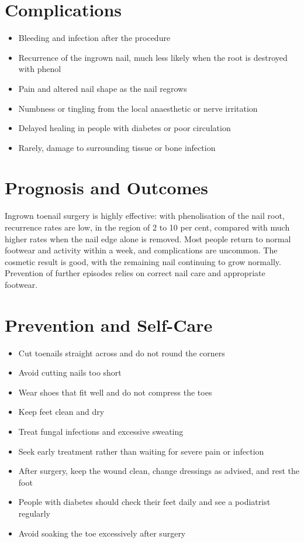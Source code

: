 \section*{Complications}
\begin{itemize}
    \item Bleeding and infection after the procedure
    \item Recurrence of the ingrown nail, much less likely when the root is destroyed with phenol
    \item Pain and altered nail shape as the nail regrows
    \item Numbness or tingling from the local anaesthetic or nerve irritation
    \item Delayed healing in people with diabetes or poor circulation
    \item Rarely, damage to surrounding tissue or bone infection
\end{itemize}

\section*{Prognosis and Outcomes}
Ingrown toenail surgery is highly effective: with phenolisation of the nail root, recurrence rates are low, in the region of 2 to 10 per cent, compared with much higher rates when the nail edge alone is removed. Most people return to normal footwear and activity within a week, and complications are uncommon. The cosmetic result is good, with the remaining nail continuing to grow normally. Prevention of further episodes relies on correct nail care and appropriate footwear.

\section*{Prevention and Self-Care}
\begin{itemize}
    \item Cut toenails straight across and do not round the corners
    \item Avoid cutting nails too short
    \item Wear shoes that fit well and do not compress the toes
    \item Keep feet clean and dry
    \item Treat fungal infections and excessive sweating
    \item Seek early treatment rather than waiting for severe pain or infection
    \item After surgery, keep the wound clean, change dressings as advised, and rest the foot
    \item People with diabetes should check their feet daily and see a podiatrist regularly
    \item Avoid soaking the toe excessively after surgery
\end{itemize}

